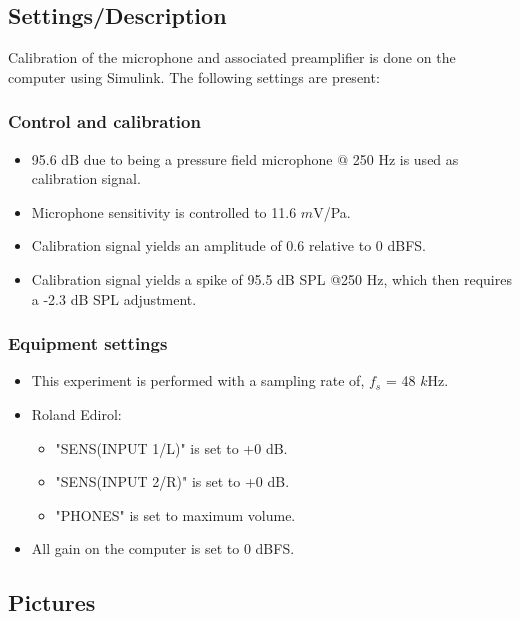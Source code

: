 \subsection{Settings/Description}
\label{SettingsCacellationPath}

Calibration of the microphone and associated preamplifier is done on the computer using Simulink\textsuperscript{\textregistered}. The following settings are present:

\subsubsection{Control and calibration}
\begin{itemize}
	\item 95.6 dB due to being a pressure field microphone $@$ 250 Hz is used as calibration signal. 
	\item Microphone sensitivity is controlled to 11.6 $m$V/Pa.
	\item Calibration signal yields an amplitude of 0.6 relative to 0 dBFS.
	\item Calibration signal yields a spike of 95.5 dB SPL @250 Hz, which then requires a -2.3 dB SPL adjustment.
\end{itemize}

\subsubsection{Equipment settings}
\begin{itemize}
	\item This experiment is performed with a sampling rate of, $f_{s}$ = 48 $k$Hz.
	\item Roland Edirol:
		\begin{itemize}
			\item "SENS(INPUT 1/L)" is set to +0 dB.
			\item "SENS(INPUT 2/R)" is set to +0 dB.
			\item "PHONES" is set to maximum volume. 
		\end{itemize}		
	\item All gain on the computer is set to 0 dBFS.
\end{itemize}


\subsection{Pictures}

